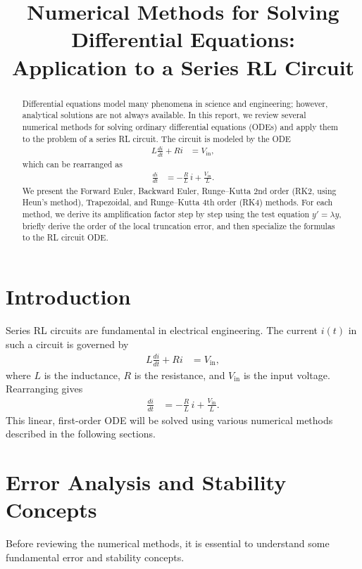 \documentclass[12pt]{article}
\title{Numerical Methods for Solving Differential Equations:\\ Application to a Series RL Circuit}
\author{}
\date{}
\begin{document}
\maketitle

\begin{abstract}
Differential equations model many phenomena in science and engineering; however, analytical solutions are not always available. In this report, we review several numerical methods for solving ordinary differential equations (ODEs) and apply them to the problem of a series RL circuit. The circuit is modeled by the ODE 
\begin{align}
L\frac{di}{dt} + Ri &= V_{\text{in}},
\end{align}
which can be rearranged as 
\begin{align}
\frac{di}{dt} &= -\frac{R}{L}\, i + \frac{V_{\text{in}}}{L}.
\end{align}
We present the Forward Euler, Backward Euler, Runge--Kutta 2nd order (RK2, using Heun's method), Trapezoidal, and Runge--Kutta 4th order (RK4) methods. For each method, we derive its amplification factor step by step using the test equation $y'=\lambda y$, briefly derive the order of the local truncation error, and then specialize the formulas to the RL circuit ODE.
\end{abstract}

\section{Introduction}
Series RL circuits are fundamental in electrical engineering. The current $i(t)$ in such a circuit is governed by 
\begin{align}
L\frac{di}{dt} + Ri &= V_{\text{in}},
\end{align}
where $L$ is the inductance, $R$ is the resistance, and $V_{\text{in}}$ is the input voltage. Rearranging gives 
\begin{align}
\frac{di}{dt} &= -\frac{R}{L}\, i + \frac{V_{\text{in}}}{L}.
\end{align}
This linear, first-order ODE will be solved using various numerical methods described in the following sections.

\section{Error Analysis and Stability Concepts}
Before reviewing the numerical methods, it is essential to understand some fundamental error and stability concepts.
\end{document}
